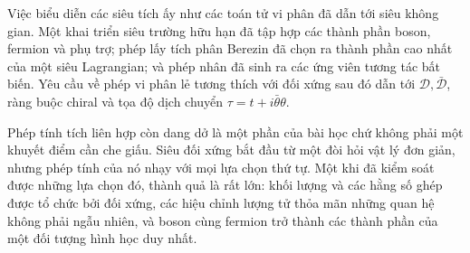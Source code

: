 Việc biểu diễn các siêu tích ấy như các toán tử vi phân đã dẫn tới siêu không gian. Một khai triển siêu trường hữu hạn đã tập hợp các thành phần boson, fermion và phụ trợ; phép lấy tích phân Berezin đã chọn ra thành phần cao nhất của một siêu Lagrangian; và phép nhân đã sinh ra các ứng viên tương tác bất biến. Yêu cầu về phép vi phân lẻ tương thích với đối xứng sau đó dẫn tới \(\mathcal D,\bar{\mathcal D}\), ràng buộc chiral và tọa độ dịch chuyển \(\tau=t+i\bar\theta\theta\).

Phép tính tích liên hợp còn dang dở là một phần của bài học chứ không phải một khuyết điểm cần che giấu. Siêu đối xứng bắt đầu từ một đòi hỏi vật lý đơn giản, nhưng phép tính của nó nhạy với mọi lựa chọn thứ tự. Một khi đã kiểm soát được những lựa chọn đó, thành quả là rất lớn: khối lượng và các hằng số ghép được tổ chức bởi đối xứng, các hiệu chỉnh lượng tử thỏa mãn những quan hệ không phải ngẫu nhiên, và boson cùng fermion trở thành các thành phần của một đối tượng hình học duy nhất.